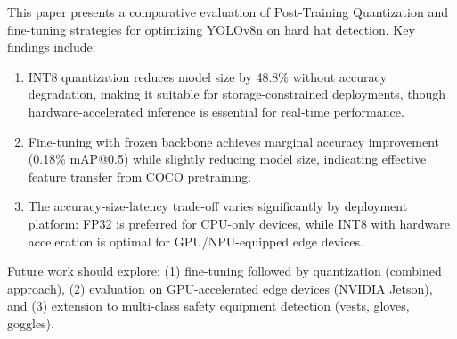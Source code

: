 \documentclass[conference,a4paper]{IEEEtran}
\begin{document}
This paper presents a comparative evaluation of Post-Training Quantization and fine-tuning strategies for optimizing YOLOv8n on hard hat detection. Key findings include:

\begin{enumerate}
    \item INT8 quantization reduces model size by 48.8\% without accuracy degradation, making it suitable for storage-constrained deployments, though hardware-accelerated inference is essential for real-time performance.
    \item Fine-tuning with frozen backbone achieves marginal accuracy improvement (0.18\% mAP@0.5) while slightly reducing model size, indicating effective feature transfer from COCO pretraining.
    \item The accuracy-size-latency trade-off varies significantly by deployment platform: FP32 is preferred for CPU-only devices, while INT8 with hardware acceleration is optimal for GPU/NPU-equipped edge devices.
\end{enumerate}

Future work should explore: (1) fine-tuning followed by quantization (combined approach), (2) evaluation on GPU-accelerated edge devices (NVIDIA Jetson), and (3) extension to multi-class safety equipment detection (vests, gloves, goggles).
\end{document}
